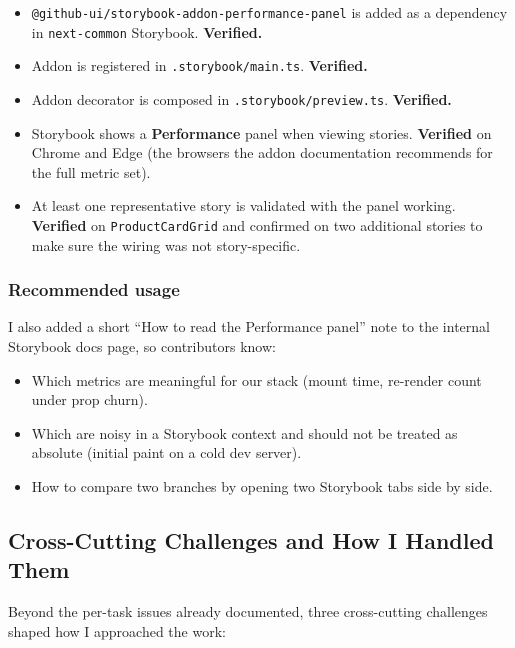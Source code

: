 \begin{itemize}
    \item \texttt{@github-ui/storybook-addon-performance-panel} is added as a dependency in \texttt{next-common} Storybook. \textbf{Verified.}
    \item Addon is registered in \texttt{.storybook/main.ts}. \textbf{Verified.}
    \item Addon decorator is composed in \texttt{.storybook/preview.ts}. \textbf{Verified.}
    \item Storybook shows a \textbf{Performance} panel when viewing stories. \textbf{Verified} on Chrome and Edge (the browsers the addon documentation recommends for the full metric set).
    \item At least one representative story is validated with the panel working. \textbf{Verified} on \texttt{ProductCardGrid} and confirmed on two additional stories to make sure the wiring was not story-specific.
\end{itemize}

\subsubsection{Recommended usage}

I also added a short ``How to read the Performance panel'' note to the internal Storybook docs page, so contributors know:

\begin{itemize}
    \item Which metrics are meaningful for our stack (mount time, re-render count under prop churn).
    \item Which are noisy in a Storybook context and should not be treated as absolute (initial paint on a cold dev server).
    \item How to compare two branches by opening two Storybook tabs side by side.
\end{itemize}

\subsection{Cross-Cutting Challenges and How I Handled Them}

Beyond the per-task issues already documented, three cross-cutting challenges shaped how I approached the work:

